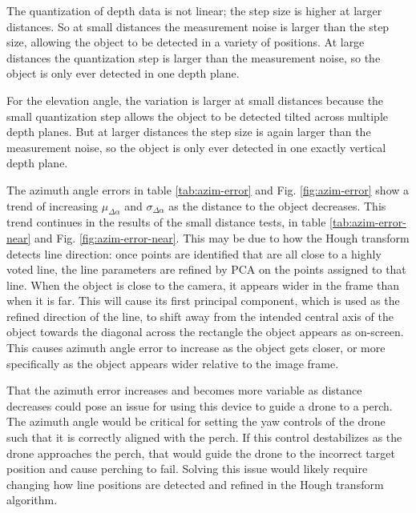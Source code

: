 The quantization of depth data is not linear; the step size is higher at larger distances. 
So at small distances the measurement noise is larger than the step size, allowing the object to be detected in a variety of positions. 
At large distances the quantization step is larger than the measurement noise, 
so the object is only ever detected in one depth plane. 

For the elevation angle, the variation is larger at small distances because the 
small quantization step allows the object to be detected tilted across multiple depth planes. But at larger distances the step size is
again larger than the measurement noise, so the object is only ever detected in one exactly vertical depth plane.

The azimuth angle errors in table \ref{tab:azim-error} and Fig. \ref{fig:azim-error} show a trend of increasing $\mu_{\Delta \alpha}$ 
and  $\sigma_{\Delta \alpha}$  as the distance to the object decreases. This trend continues in the results of the small distance tests,
in table \ref{tab:azim-error-near} and Fig. \ref{fig:azim-error-near}.
This may be due to how the Hough transform detects line direction: once points are identified that are all close to a highly voted line,
the line parameters are refined by PCA on the points assigned to that line. When the object is close to the camera, it appears
wider in the frame than when it is far. This will cause its first principal component, which is used as the refined direction
of the line, to shift away from the intended central axis of the object towards the diagonal across the rectangle the object appears
as on-screen. This causes azimuth angle error to increase as the object gets closer, or more specifically as the object appears wider
relative to the image frame.

That the azimuth error increases and becomes more variable as distance decreases could pose an issue for using this device to guide a drone
to a perch. The azimuth angle would be critical for setting the yaw controls of the drone such that it is correctly aligned with the perch.
If this control destabilizes as the drone approaches the perch, that would guide the drone to the incorrect target position and cause perching 
to fail. Solving this issue would likely require changing how line positions are detected and refined in the Hough transform algorithm.

